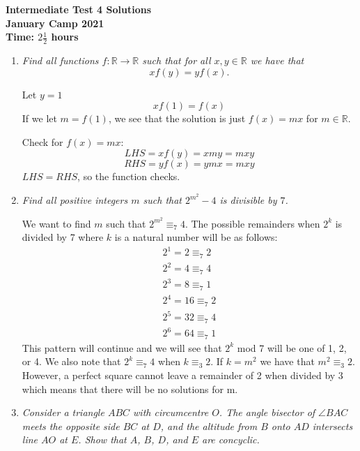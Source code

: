 \documentclass{article}
\begin{document}
\thispagestyle{empty}

\begin{center}
  \textbf{\Large Intermediate Test 4 Solutions}
  \\ \vspace{1em}
  \textbf{\large January Camp 2021}
  \\ \vspace{1em}
  \textbf{\large Time: $2\frac{1}{2}$ hours}
\end{center}

\vspace{24pt}

\begin{enumerate}[1.]

\item %
{\itshape Find all functions $f : \mathbb{R} \to \mathbb{R}$ such that for all $x, y \in \mathbb{R}$ we have that
\[ xf(y) = yf(x). \]}

Let $y = 1$ $$xf(1) = f(x)$$ If we let $m = f(1)$, we see that the solution is just $f(x) = mx$ for $m \in \mathbb{R}$.

Check for $f(x) = mx$:$$LHS = xf(y) = xmy = mxy$$ $$RHS = yf(x) = ymx = mxy$$ $LHS = RHS$, so the function checks.

\item %
{\itshape Find all positive integers $m$ such that $2^{m^2}-4$ is divisible by $7$.}

We want to find $m$ such that $2^{m^2}\equiv _{7} 4$. 
The possible remainders when $2^k$ is divided by 7 where $k$ is a natural number will be as follows:
\begin{align*} 
2^1 = 2 \equiv _{7} 2\\
2^2 = 4 \equiv _{7} 4\\
2^3 = 8 \equiv _{7} 1\\
2^4 = 16 \equiv _{7} 2\\
2^5 = 32 \equiv _{7} 4\\
2^6 = 64 \equiv _{7} 1
\end{align*}
This pattern will continue and we will see that $2^k$ mod 7 will be one of 1, 2, or 4. 
We also note that $2^k \equiv _{7} 4$ when $k \equiv _{3} 2$. 
If $k = m^2$ we have that $m^2 \equiv _{3} 2$. However, a perfect square cannot leave a remainder of 2 when divided by 3 which means that there will be no solutions for m.


\item %
{\itshape Consider a triangle $ABC$ with circumcentre $O$.
The angle bisector of $\angle BAC$ meets the opposite side $BC$ at $D$, and the altitude from $B$ onto $AD$ intersects line $AO$ at $E$.
Show that $A$, $B$, $D$, and $E$ are concyclic.}



\end{enumerate}
\end{document}
